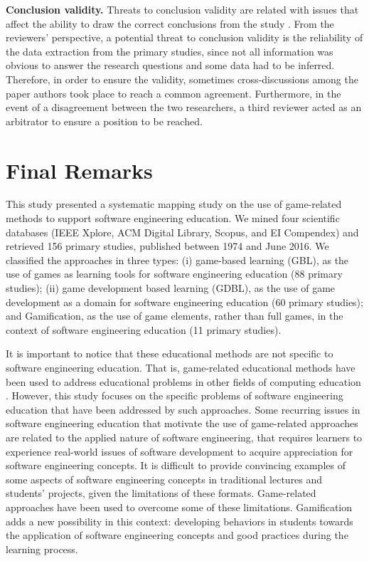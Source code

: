 \textbf{Conclusion validity.} Threats to conclusion validity are related with issues that affect the ability to draw the correct conclusions from the study \citep{Wohlin:2012}. From the reviewers’ perspective, a potential threat to conclusion validity is the reliability of the data extraction from the primary studies, since not all information was obvious to answer the research questions and some data had to be inferred. Therefore, in order to ensure the validity, sometimes cross-discussions among the paper authors took place to reach a common agreement. Furthermore, in the event of a disagreement between the two researchers, a third reviewer acted as an arbitrator to ensure a position to be reached.

\section{Final Remarks}
\label{sec:final}

This study presented a systematic mapping study on the use of game-related methods to support software engineering education. We mined four scientific databases (IEEE Xplore, ACM Digital Library, Scopus, and EI Compendex) and retrieved 156 primary studies, published between 1974 and June 2016. We classified the approaches in three types: (i) game-based learning (GBL), as the use of games as learning tools for software engineering education (88 primary studies); (ii) game development based learning (GDBL), as the use of game development as a domain for software engineering education (60 primary studies); and Gamification, as the use of game elements, rather than full games, in the context of software engineering education (11 primary studies). 

It is important to notice that these educational methods are not specific to software engineering education. That is, game-related educational methods have been used to address educational problems in other fields of computing education \citep{Battistella:2016, Petri:2017}. However, this study focuses on the specific problems of software engineering education that have been addressed by such approaches. Some recurring issues in software engineering education that motivate the use of game-related approaches are related to the applied nature of software engineering, that requires learners to experience real-world issues of software development to acquire appreciation for software engineering concepts. It is difficult to provide convincing examples of some aspects of software engineering concepts in traditional lectures and students’ projects, given the limitations of these formats. Game-related approaches have been used to overcome some of these limitations. Gamification adds a new possibility in this context: developing behaviors in students towards the application of software engineering concepts and good practices during the learning process. 

